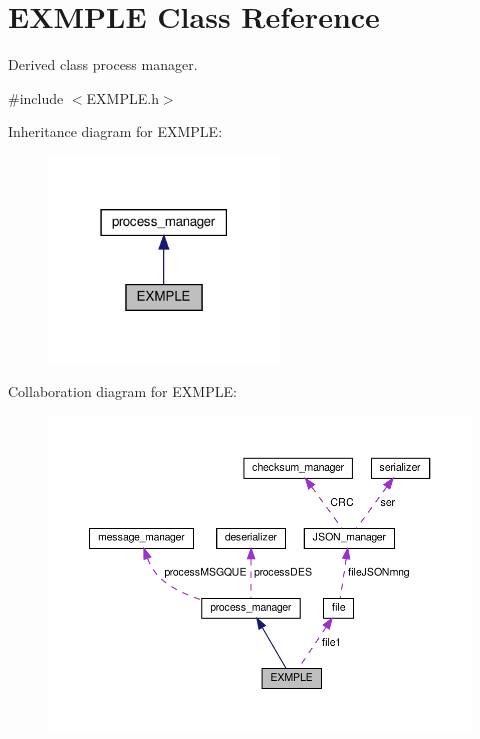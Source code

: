 \hypertarget{classEXMPLE}{}\section{E\+X\+M\+P\+LE Class Reference}
\label{classEXMPLE}


Derived class process manager.  




{\ttfamily \#include $<$E\+X\+M\+P\+L\+E.\+h$>$}



Inheritance diagram for E\+X\+M\+P\+LE\+:
\nopagebreak
\begin{figure}[H]
\begin{center}
\leavevmode
\includegraphics[width=174pt]{classEXMPLE__inherit__graph}
\end{center}
\end{figure}


Collaboration diagram for E\+X\+M\+P\+LE\+:
\nopagebreak
\begin{figure}[H]
\begin{center}
\leavevmode
\includegraphics[width=350pt]{classEXMPLE__coll__graph}
\end{center}
\end{figure}
